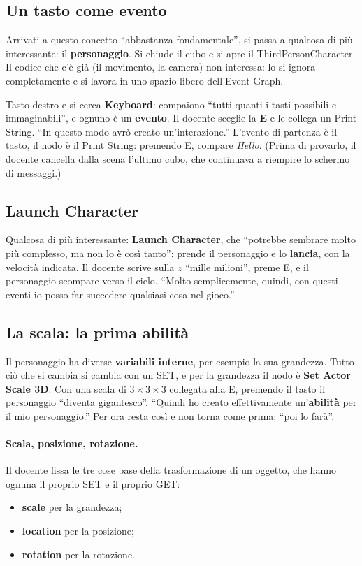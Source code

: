 \subsection{Un tasto come evento}

Arrivati a questo concetto ``abbastanza fondamentale'', si passa a qualcosa di
più interessante: il \textbf{personaggio}. Si chiude il cubo e si apre il
ThirdPersonCharacter. Il codice che c'è già (il movimento, la camera) non
interessa: lo si ignora completamente e si lavora in uno spazio libero
dell'Event Graph.

Tasto destro e si cerca \textbf{Keyboard}: compaiono ``tutti quanti i tasti
possibili e immaginabili'', e ognuno è un \textbf{evento}. Il docente sceglie
la \textbf{E} e le collega un Print String. ``In questo modo avrò creato
un'interazione.'' L'evento di partenza è il tasto, il nodo è il Print String:
premendo E, compare \emph{Hello}. (Prima di provarlo, il docente cancella dalla
scena l'ultimo cubo, che continuava a riempire lo schermo di messaggi.)

\subsection{Launch Character}

Qualcosa di più interessante: \textbf{Launch Character}, che ``potrebbe
sembrare molto più complesso, ma non lo è così tanto'': prende il personaggio
e lo \textbf{lancia}, con la velocità indicata. Il docente scrive sulla $z$
``mille milioni'', preme E, e il personaggio scompare verso il cielo.
``Molto semplicemente, quindi, con questi eventi io posso far succedere
qualsiasi cosa nel gioco.''

\subsection{La scala: la prima abilità}

Il personaggio ha diverse \textbf{variabili interne}, per esempio la sua
grandezza. Tutto ciò che si cambia si cambia con un SET, e per la grandezza il
nodo è \textbf{Set Actor Scale 3D}. Con una scala di $3 \times 3 \times 3$
collegata alla E, premendo il tasto il personaggio ``diventa gigantesco''.
``Quindi ho creato effettivamente un'\textbf{abilità} per il mio
personaggio.'' Per ora resta così e non torna come prima; ``poi lo farà''.

\paragraph{Scala, posizione, rotazione.} Il docente fissa le tre cose base
della trasformazione di un oggetto, che hanno ognuna il proprio SET e il
proprio GET:
\begin{itemize}
  \item \textbf{scale} per la grandezza;
  \item \textbf{location} per la posizione;
  \item \textbf{rotation} per la rotazione.
\end{itemize}

